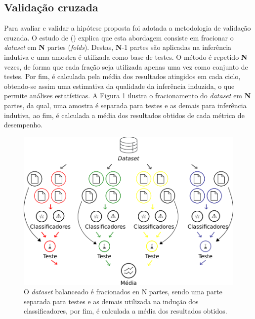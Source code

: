 \subsection{Validação cruzada}
\label{subsection:validacao_cruzada}

Para avaliar e validar a hipótese proposta foi adotada a metodologia de 
validação cruzada. O estudo de  
(\citeyear{tavares2007estudo}) explica que esta abordagem consiste em 
fracionar o \textit{dataset} em \textbf{N} partes (\textit{folds}). Destas, 
\textbf{N}-1 partes são aplicadas na inferência indutiva e uma amostra é 
utilizada como base de testes. O método é repetido \textbf{N} vezes, de 
forma que cada fração seja utilizada apenas uma vez como conjunto de testes. 
Por fim, é calculada pela média dos resultados atingidos em cada ciclo, 
obtendo-se assim uma estimativa da qualidade da inferência induzida, o que 
permite análises estatísticas. A Figura \ref{figure:metodologia_4} ilustra o 
fracionamento do \textit{dataset} em \textbf{N} partes, da qual, uma amostra é 
separada para testes e as demais para inferência indutiva, ao fim, é calculada 
a média dos resultados obtidos de cada métrica de desempenho. 

\begin{figure}[H]
\begin{center}
    \includegraphics[scale=0.50]{images/metodologia_4.png}
\end{center}
\caption{O \textit{dataset} balanceado é fracionados en N partes, sendo uma 
parte separada para testes e as demais utilizada na indução dos classificadores, 
por fim, é calculada a média dos resultados obtidos.}
\label{figure:metodologia_4}
\end{figure}